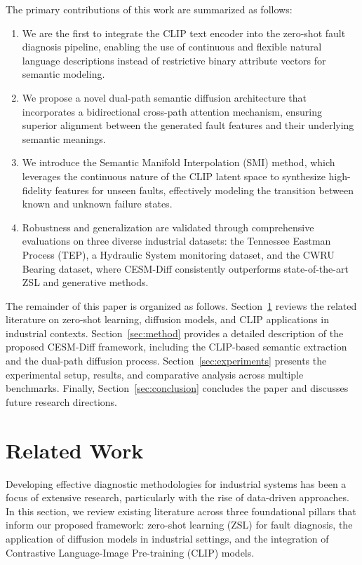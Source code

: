 \documentclass[journal,12pt,onecolumn]{IEEEtran}
\begin{document}
The primary contributions of this work are summarized as follows:
\begin{enumerate}
    \item We are the first to integrate the CLIP text encoder into the zero-shot fault diagnosis pipeline, enabling the use of continuous and flexible natural language descriptions instead of restrictive binary attribute vectors for semantic modeling.
    \item We propose a novel dual-path semantic diffusion architecture that incorporates a bidirectional cross-path attention mechanism, ensuring superior alignment between the generated fault features and their underlying semantic meanings.
    \item We introduce the Semantic Manifold Interpolation (SMI) method, which leverages the continuous nature of the CLIP latent space to synthesize high-fidelity features for unseen faults, effectively modeling the transition between known and unknown failure states.
    \item Robustness and generalization are validated through comprehensive evaluations on three diverse industrial datasets: the Tennessee Eastman Process (TEP), a Hydraulic System monitoring dataset, and the CWRU Bearing dataset, where CESM-Diff consistently outperforms state-of-the-art ZSL and generative methods.
\end{enumerate}

The remainder of this paper is organized as follows. Section~\ref{sec:related} reviews the related literature on zero-shot learning, diffusion models, and CLIP applications in industrial contexts. Section~\ref{sec:method} provides a detailed description of the proposed CESM-Diff framework, including the CLIP-based semantic extraction and the dual-path diffusion process. Section~\ref{sec:experiments} presents the experimental setup, results, and comparative analysis across multiple benchmarks. Finally, Section~\ref{sec:conclusion} concludes the paper and discusses future research directions.

\section{Related Work}
\label{sec:related}

Developing effective diagnostic methodologies for industrial systems has been a focus of extensive research, particularly with the rise of data-driven approaches. In this section, we review existing literature across three foundational pillars that inform our proposed framework: zero-shot learning (ZSL) for fault diagnosis, the application of diffusion models in industrial settings, and the integration of Contrastive Language-Image Pre-training (CLIP) models.
\end{document}
